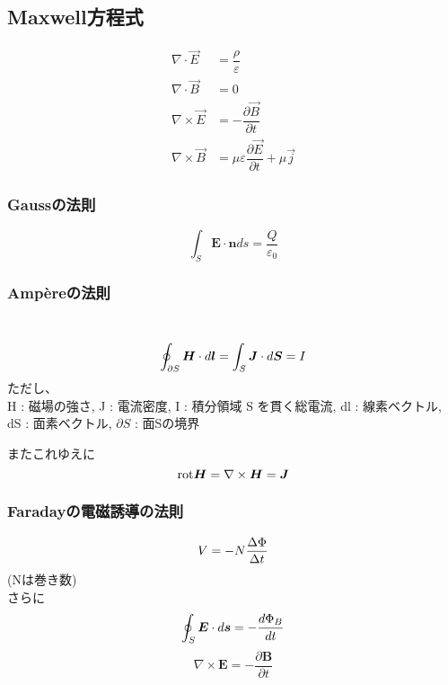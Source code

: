\documentclass[dvipdfmx,uplatex]{jsarticle}
\begin{document}
\subsection{Maxwell方程式}
\begin{theo}
\begin{align}
\nabla \cdot \vec{E} &= \dfrac{\rho}{\varepsilon}\\
\nabla \cdot \vec{B} &= 0\\
\nabla \times \vec{E} &= -\dfrac{\partial \vec{B}}{\partial t}\\
\nabla \times \vec{B} &= \mu\varepsilon \dfrac{\partial \vec{E}}{\partial t} + \mu\vec{j}
\end{align}
\end{theo}

\subsubsection{Gaussの法則}
\begin{theo}
\[
\int_S \bm{E} \cdot \bm{n} ds = \frac{Q}{\varepsilon _0}
\]
\end{theo}

\subsubsection{Amp\`{e}reの法則}
\begin{theo}[アンペールの法則] \mbox{}\\
\[
\oint_{\partial S} \bm{H} \cdot d \bm{l} = \int_S \bm{J} \cdot d \bm{S} = I \\
\]
ただし、\\
H	: 磁場の強さ,
J	: 電流密度,
I	: 積分領域 S を貫く総電流,
dl	: 線素ベクトル,
dS	: 面素ベクトル,
$\partial S$	: 面Sの境界 \\
\end{theo}
またこれゆえに
\[
\mathrm{rot} \bm{H} = \nabla \times \bm{H} = \bm{J} \\
\]

\subsubsection{Faradayの電磁誘導の法則}
\begin{theo}
\[
V = -N \frac{\Delta \Phi}{\Delta t} \\
\]
(Nは巻き数)\\
さらに
\[
\oint_S \bm{E} \cdot d\bm{s} = - \frac{d \Phi _B}{dt}\\
\]
\[
\nabla \times \bm{E} = - \frac{\partial \bm{B}}{\partial t}
\]
\end{theo}
\end{document}
